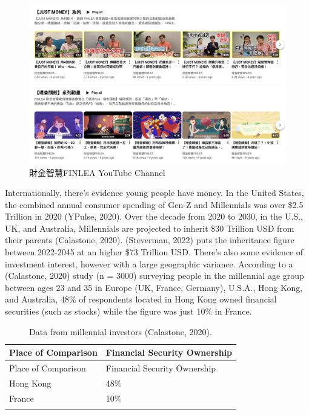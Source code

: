 \documentclass[
  12pt,
  letterpaper,
  DIV=11,
  numbers=noendperiod]{scrartcl}
\begin{document}
\begin{figure}[H]

{\centering \includegraphics[width=1\linewidth,height=\textheight,keepaspectratio]{./images/college/taiwan-financial-literacy-youtube.png}

}

\caption{財金智慧FINLEA YouTube Channel}

\end{figure}%

Internationally, there's evidence young people have money. In the United
States, the combined annual consumer spending of Gen-Z and Millennials
was over \$2.5 Trillion in 2020 (YPulse, 2020). Over the decade from
2020 to 2030, in the U.S., UK, and Australia, Millennials are projected
to inherit \$30 Trillion USD from their parents (Calastone, 2020).
(Steverman, 2022) puts the inheritance figure between 2022-2045 at an
higher \$73 Trillion USD. There's also some evidence of investment
interest, however with a large geographic variance. According to a
(Calastone, 2020) study (n = 3000) surveying people in the millennial
age group between ages 23 and 35 in Europe (UK, France, Germany),
U.S.A., Hong Kong, and Australia, 48\% of respondents located in Hong
Kong owned financial securities (such as stocks) while the figure was
just 10\% in France.

\def\pandoctableshortcapt{Millennial Investors}

\begin{longtable}[]{@{}ll@{}}
\caption[Millennial Investors]{Data from millennial investors
(Calastone, 2020).}\tabularnewline
\toprule\noalign{}
Place of Comparison & Financial Security Ownership \\
\midrule\noalign{}
\endfirsthead
\toprule\noalign{}
Place of Comparison & Financial Security Ownership \\
\midrule\noalign{}
\endhead
\bottomrule\noalign{}
\endlastfoot
Hong Kong & 48\% \\
France & 10\% \\
& \\
\end{longtable}
\end{document}
